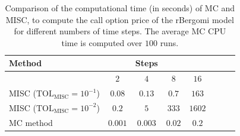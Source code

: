 \begin{table}[htbp]
	\centering
	\begin{tabular}{l*{6}{c}r}
		\toprule[1.5pt]
	Method & & Steps  & &     \\
	\hline
	        & $2$ & $4$ & $8$  &$16$  \\
		\hline
		MISC ($\text{TOL}_{\text{MISC}}=10^{-1}$)  & $0.08$ & $0.13$ & $0.7$  & $163$ \\
		MISC ($\text{TOL}_{\text{MISC}}=10^{-2}$)  & $0.2$& $5$ & $333$ &  $1602$\\
%	
		\hline	
		MC method & $0.001$  & $0.003$  & $0.02$ & $0.2$ \\
		\bottomrule[1.25pt]	
	\end{tabular}
	\caption{Comparison of the computational time (in seconds) of  MC and MISC, to compute the call option price of the rBergomi model for different numbers of time steps. The average MC CPU time is computed over $100$ runs.}
	\label{Comparsion of the computational time of  MC and MISC, used to compute Call option price of rBergomi model for different number of time steps. Case $K=1, H=0.07$, linear}
\end{table}
\FloatBarrier

